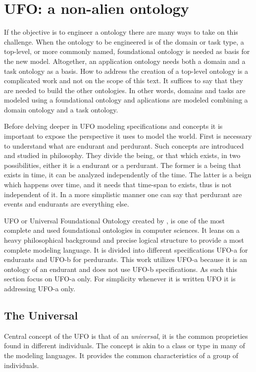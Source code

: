 \section{UFO: a non-alien ontology} 

If the objective is to engineer a ontology there are many ways to take on this challenge. When the ontology to be engineered is of the domain or task type, a top-level, or more commonly named, foundational ontology is needed as basis for the new model. Altogether, an application ontology needs both a domain and a task ontology as a basis. How to address the creation of a top-level ontology is a complicated work and not on the scope of this text. It suffices to say that they are needed to build the other ontologies. In other words, domains and tasks are modeled using a foundational ontology and aplications are modeled combining a domain ontology and a task ontology.

Before delving deeper in UFO modeling specifications and concepts it is important to expose the perspective it uses to model the world. First is necessary to understand what are endurant and perdurant. Such concepts are introduced and studied in philosophy. They divide the being, or that which exists, in two possibilities, either it is a endurant or a perdurant. The former is a being that exists in time, it can be analyzed independently of the time. The latter is a beign which happens over time, and it needs that time-span to exists, thus is not independent of it. In a more simplistic manner one can say that perdurant are events and endurants are everything else. 

UFO or Universal Foundational Ontology created by \cite{guizzardi_ontological_2005}, is one of the most complete and used foundational ontologies in computer sciences. It leans on a heavy philosophical background and precise logical structure to provide a most complete modeling language. It is divided into different specifications UFO-a for endurants and UFO-b for perdurants. This work utilizes UFO-a because it is an ontology of an endurant and does not use UFO-b specifications. As such this section focus on UFO-a only. For simplicity whenever it is written UFO it is addressing UFO-a only.

\subsection{The Universal}

Central concept of the UFO is that of an \textit{universal}, it is the common proprieties found in different individuals. The concept is akin to a class or type in many of the modeling languages. It provides the common characteristics of a group of individuals. 

